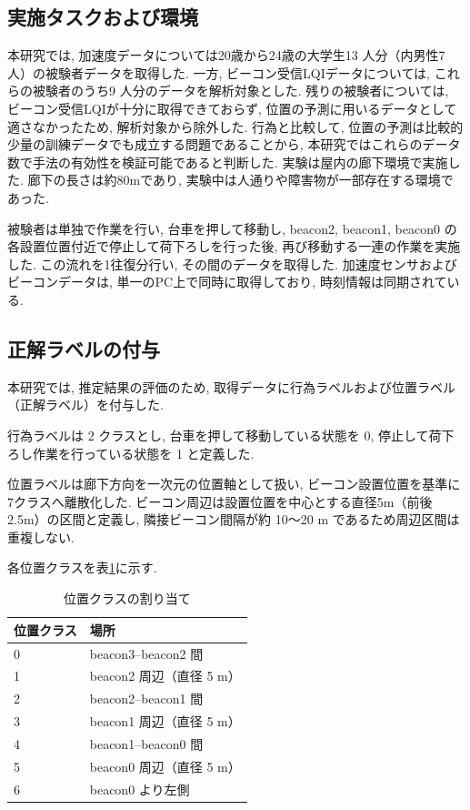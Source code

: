 \documentclass[a4paper,12pt]{jreport}
\begin{document}
\subsection{実施タスクおよび環境}
本研究では, 加速度データについては20歳から24歳の大学生13 人分（内男性7 人）の被験者データを取得した. 一方, ビーコン受信LQIデータについては, これらの被験者のうち9 人分のデータを解析対象とした. 残りの被験者については, ビーコン受信LQIが十分に取得できておらず, 位置の予測に用いるデータとして適さなかったため, 解析対象から除外した. 行為と比較して, 位置の予測は比較的少量の訓練データでも成立する問題であることから, 本研究ではこれらのデータ数で手法の有効性を検証可能であると判断した. 実験は屋内の廊下環境で実施した. 廊下の長さは約80mであり, 実験中は人通りや障害物が一部存在する環境であった. 

被験者は単独で作業を行い, 台車を押して移動し, beacon2, beacon1, beacon0 の各設置位置付近で停止して荷下ろしを行った後, 再び移動する一連の作業を実施した. この流れを1往復分行い, その間のデータを取得した. 加速度センサおよびビーコンデータは, 単一のPC上で同時に取得しており, 時刻情報は同期されている. 


\subsection{正解ラベルの付与}
本研究では, 推定結果の評価のため, 取得データに行為ラベルおよび位置ラベル（正解ラベル）を付与した. 

行為ラベルは 2 クラスとし, 台車を押して移動している状態を 0, 停止して荷下ろし作業を行っている状態を 1 と定義した. 

位置ラベルは廊下方向を一次元の位置軸として扱い, ビーコン設置位置を基準に7クラスへ離散化した. ビーコン周辺は設置位置を中心とする直径5m（前後2.5m）の区間と定義し, 隣接ビーコン間隔が約 10〜20 m であるため周辺区間は重複しない. 

各位置クラスを表\ref{tab:loc_class}に示す. 


\begin{table}[tb]
  \centering
  \caption{位置クラスの割り当て}
  \label{tab:loc_class}
  \renewcommand{\arraystretch}{1.2}
  \begin{tabular}{|p{3cm}|p{6cm}|}
  \hline
  位置クラス & 場所 \\ \hline
0 & beacon3–beacon2 間 \\ \hline
1 & beacon2 周辺（直径 5 m） \\ \hline
2 & beacon2–beacon1 間 \\ \hline
3 & beacon1 周辺（直径 5 m） \\ \hline
4 & beacon1–beacon0 間 \\ \hline
5 & beacon0 周辺（直径 5 m） \\ \hline
6 & beacon0 より左側  \\ \hline
   
  \end{tabular}
\end{table}
\end{document}
